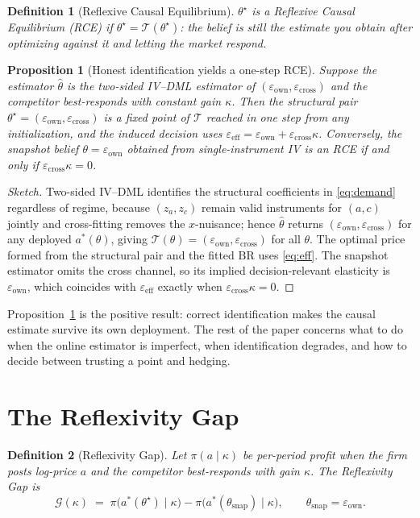 \documentclass[11pt]{article}
\newtheorem{definition}{Definition}
\newtheorem{proposition}{Proposition}
\newcommand{\Tcal}{\mathcal{T}}
\newcommand{\Gcal}{\mathcal{G}}
\newcommand{\eps}{\varepsilon}
\newcommand{\epsown}{\eps_{\mathrm{own}}}
\newcommand{\epscross}{\eps_{\mathrm{cross}}}
\newcommand{\epseff}{\eps_{\mathrm{eff}}}
\begin{document}
\begin{definition}[Reflexive Causal Equilibrium]
$\theta^\star$ is a Reflexive Causal Equilibrium (RCE) if $\theta^\star = \Tcal(\theta^\star)$:
the belief is still the estimate you obtain after optimizing against it and letting the market
respond.
\end{definition}

\begin{proposition}[Honest identification yields a one-step RCE]\label{prop:rce}
Suppose the estimator $\hat\theta$ is the two-sided IV--DML estimator of
$(\epsown,\epscross)$ and the competitor best-responds with constant gain $\kappa$. Then the
structural pair $\theta^\star=(\epsown,\epscross)$ is a fixed point of $\Tcal$ reached in one
step from any initialization, and the induced decision uses $\epseff=\epsown+\epscross\kappa$.
Conversely, the snapshot belief $\theta=\epsown$ obtained from single-instrument IV is an RCE if
and only if $\epscross\kappa=0$.
\end{proposition}
\begin{proof}[Sketch]
Two-sided IV--DML identifies the structural coefficients in \eqref{eq:demand} regardless of
regime, because $(z_a,z_c)$ remain valid instruments for $(a,c)$ jointly and cross-fitting
removes the $x$-nuisance; hence $\hat\theta$ returns $(\epsown,\epscross)$ for any deployed
$a^*(\theta)$, giving $\Tcal(\theta)=(\epsown,\epscross)$ for all $\theta$. The optimal price
formed from the structural pair and the fitted $\mathrm{BR}$ uses \eqref{eq:eff}. The snapshot
estimator omits the cross channel, so its implied decision-relevant elasticity is $\epsown$,
which coincides with $\epseff$ exactly when $\epscross\kappa=0$.
\end{proof}

Proposition~\ref{prop:rce} is the positive result: correct identification makes the causal
estimate survive its own deployment. The rest of the paper concerns what to do when the online
estimator is imperfect, when identification degrades, and how to decide between trusting a point
and hedging.

\section{The Reflexivity Gap}\label{sec:gap}
\begin{definition}[Reflexivity Gap]
Let $\pi(a\mid\kappa)$ be per-period profit when the firm posts log-price $a$ and the competitor
best-responds with gain $\kappa$. The Reflexivity Gap is
\[
\Gcal(\kappa) \;=\; \pi\big(a^*(\theta^\star)\mid\kappa\big) - \pi\big(a^*(\theta_{\mathrm{snap}})\mid\kappa\big),
\qquad \theta_{\mathrm{snap}}=\epsown .
\]
\end{definition}
\end{document}
